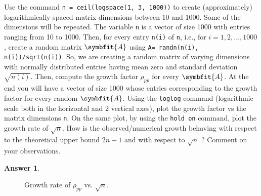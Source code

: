 \documentclass{article}
\theoremstyle{definition}
\newtheorem*{answer}{Answer}
\newcommand{\mat}[1]{\symbfit{#1}}
\begin{document}
\begin{enumerate}[leftmargin=\labelsep]
	      Use the command \texttt{n = ceil(logspace(1, 3, 1000))} to create (approximately) logarithmically spaced matrix dimensions between 10 and 1000. Some of the dimensions will be repeated. The variable \texttt{n} is a vector of size 1000 with entries ranging from 10 to 1000. Then, for every entry \texttt{n(i)} of \texttt{n}, i.e., for \(i = 1, 2, \dots , 1000\), create a random matrix \(\mat{A}\) using \texttt{A= randn(n(i), n(i))/sqrt(n(i))}. So, we are creating a random matrix of varying dimensions with normally distributed entries having mean zero and standard deviation \(\sqrt{n(i)}\). Then, compute the growth factor \(\rho_{pp}\) for every \(\mat{A}\). At the end you will have a vector of size 1000 whose entries corresponding to the growth factor for every random \(\mat{A}\). Using the \texttt{loglog} command (logarithmic scale both in the horizontal and 2 vertical axes), plot the growth factor vs the matrix dimensions \texttt{n}. On the same plot, by using the \texttt{hold on} command, plot the growth rate of \(\sqrt{n}\). How is the observed/numerical growth behaving with respect to the theoretical upper bound \(2n-1\) and with respect to \(\sqrt{n}\) ? Comment on your observations.
	      \begin{answer}
		      \begin{figure}
			      \centering
			      \caption{Growth rate of \(\rho_{pp}\) vs. \(\sqrt{n}\).}\label{fig:rhopp}
		      \end{figure}
	      \end{answer}
\end{enumerate}
\end{document}

